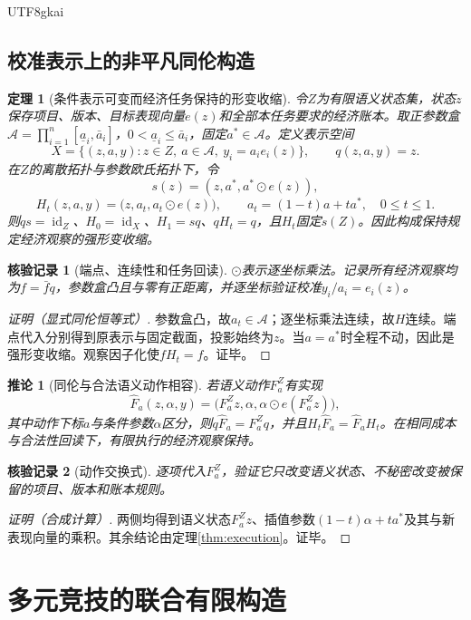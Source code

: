 \documentclass[12pt,a4paper,openany]{report}
\newtheorem{theorem}{定理}[chapter]
\newtheorem{corollary}{推论}[chapter]
\newtheorem{Certificate}{核验记录}[chapter]
\begin{document}
\begin{CJK*}{UTF8}{gkai}
\section{校准表示上的非平凡同伦构造}
\begin{theorem}[条件表示可变而经济任务保持的形变收缩]
\label{thm:homotopy}
令$Z$为有限语义状态集，状态$z$保存项目、版本、目标表现向量$e(z)$和全部本任务要求的经济账本。取正参数盒$\mathcal A=\prod_{i=1}^n[\underline a_i,\bar a_i]$，$0<\underline a_i\le\bar a_i$，固定$a^*\in\mathcal A$。定义表示空间
\[
 X=\{(z,a,y):z\in Z,\ a\in\mathcal A,\ y_i=a_i e_i(z)\},
 \qquad q(z,a,y)=z.
\]
在$Z$的离散拓扑与参数欧氏拓扑下，令
\[
 s(z)=(z,a^*,a^*\odot e(z)),
\]
\[
 H_t(z,a,y)=\bigl(z,a_t,a_t\odot e(z)\bigr),\qquad
 a_t=(1-t)a+ta^*,\quad0\le t\le1.
\]
则$qs=\operatorname{id}_Z$、$H_0=\operatorname{id}_X$、$H_1=sq$、$qH_t=q$，且$H_t$固定$s(Z)$。因此构成保持规定经济观察的强形变收缩。
\end{theorem}
\begin{Certificate}[端点、连续性和任务回读]
$\odot$表示逐坐标乘法。记录所有经济观察均为$f=\bar f q$，参数盒凸且与零有正距离，并逐坐标验证校准$y_i/a_i=e_i(z)$。
\end{Certificate}
\begin{proof}[证明（显式同伦恒等式）]
参数盒凸，故$a_t\in\mathcal A$；逐坐标乘法连续，故$H$连续。端点代入分别得到原表示与固定截面，投影始终为$z$。当$a=a^*$时全程不动，因此是强形变收缩。观察因子化使$fH_t=f$。证毕。
\end{proof}
\begin{corollary}[同伦与合法语义动作相容]
\label{cor:homotopy-action}
若语义动作$F_a^Z$有实现
\[
 \widehat F_a(z,\alpha,y)
 =\bigl(F_a^Zz,\alpha,\alpha\odot e(F_a^Zz)\bigr),
\]
其中动作下标$a$与条件参数$\alpha$区分，则$q\widehat F_a=F_a^Zq$，并且$H_t\widehat F_a=\widehat F_aH_t$。在相同成本与合法性回读下，有限执行的经济观察保持。
\end{corollary}
\begin{Certificate}[动作交换式]
逐项代入$F_a^Z$，验证它只改变语义状态、不秘密改变被保留的项目、版本和账本规则。
\end{Certificate}
\begin{proof}[证明（合成计算）]
两侧均得到语义状态$F_a^Zz$、插值参数$(1-t)\alpha+ta^*$及其与新表现向量的乘积。其余结论由定理\ref{thm:execution}。证毕。
\end{proof}


\chapter{多元竞技的联合有限构造}
\label{chap:example}

\end{CJK*}
\end{document}
